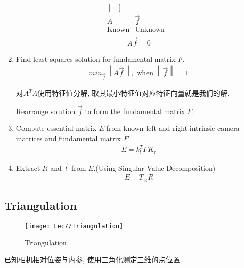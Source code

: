 \begin{enumerate}
\begin{align*}
\begin{array}{cccc}
\begin{bmatrix}
            \end{bmatrix}\\
            A&\vec{f}&\\
            \text{Known}&\text{Unknown}&
        \end{array}
    \end{align*}
    \begin{align*}
        A\vec{f}=0
    \end{align*}
    \item Find least squares solution for fundamental matrix $F$.
    \begin{align*}
        min_{\vec{f}}\left\| A\vec{f} \right\|,\text{ when }\left\| \vec{f} \right\|=1
    \end{align*}

    对$A^TA$使用特征值分解, 取其最小特征值对应特征向量就是我们的解. 

    Rearrange solution $\vec{f}$ to form the fundamental matrix $F$.
    \item Compute essential matrix $E$ from known left and right intrinsic camera matrices and fundamental matrix $F$.
    \begin{align*}
        E=k_l^T F K_r
    \end{align*}
    \item Extract $R$ and $\vec{t}$ from $E$.(Using Singular Value Decomposition)
    \begin{align*}
        E=T_{\times}R
    \end{align*}

\end{enumerate}

\subsection{Triangulation}
\begin{figure}[H]
    \centering
    \texttt{[image: Lec7/Triangulation]}
    \caption{Triangulation}
\end{figure}

已知相机相对位姿与内参, 使用三角化测定三维的点位置. 

